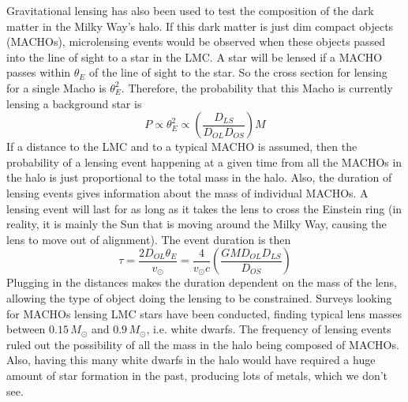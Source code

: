 Gravitational lensing has also been used to test the composition of the 
dark matter in the Milky Way's halo.  If this dark matter is just dim compact 
objects (MACHOs), microlensing events would be observed when these objects 
passed into the line of sight to a star in the LMC.  A star will be lensed 
if a MACHO passes within $\theta_E$ of the line of sight to the star.  
So the cross section for lensing for a single Macho is $\theta_E^2$.  
Therefore, the probability that this Macho is currently lensing a background 
star is 
\begin{equation}
P\propto\theta_E^2\propto\left(\frac{D_{LS}}{D_{OL}D_{OS}}\right)M
\end{equation}
If a distance to the LMC and to a typical MACHO is assumed, then the 
probability of a lensing event happening at a given time from all the MACHOs 
in the halo is just proportional to the total mass in the halo.  Also, the 
duration of lensing events gives information about the mass of individual 
MACHOs.  A lensing event will last for as long as it takes the lens to 
cross the Einstein ring (in reality, it is mainly the Sun that is moving around 
the Milky Way, causing the lens to move out of alignment).  The event duration 
is then
\begin{equation}
\tau=\frac{2D_{OL}\theta_E}{v_{\odot}}=\frac{4}{v_{\odot}c}\left(\frac{GMD_{OL}D_{LS}}{D_{OS}}\right)
\end{equation}
Plugging in the distances makes the duration dependent on the mass of the 
lens, allowing the type of object doing the lensing to be constrained.  
Surveys looking for MACHOs lensing LMC stars have been conducted, finding 
typical lens masses between $0.15\,M_{\odot}$ and $0.9\,M_{\odot}$, i.e. white 
dwarfs.  The frequency of lensing events ruled out the possibility of all 
the mass in the halo being composed of MACHOs.  Also, having this many 
white dwarfs in the halo would have required a huge amount of star formation 
in the past, producing lots of metals, which we don't see.  


